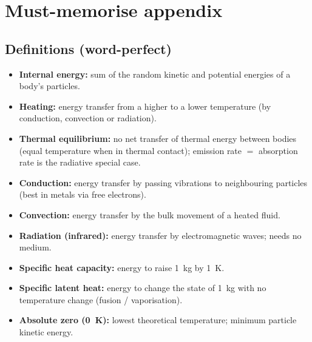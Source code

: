 \documentclass[11pt,a4paper]{article}
\begin{document}
\clearpage
\section{Must-memorise appendix}

\subsection{Definitions (word-perfect)}
\begin{itemize}[leftmargin=1.4em,itemsep=2pt]
  \item \textbf{Internal energy:} sum of the random kinetic and potential energies of a
        body's particles.
  \item \textbf{Heating:} energy transfer from a higher to a lower temperature (by
        conduction, convection or radiation).
  \item \textbf{Thermal equilibrium:} no net transfer of thermal energy between bodies
        (equal temperature when in thermal contact); emission rate $=$ absorption rate is
        the radiative special case.
  \item \textbf{Conduction:} energy transfer by passing vibrations to neighbouring
        particles (best in metals via free electrons).
  \item \textbf{Convection:} energy transfer by the bulk movement of a heated fluid.
  \item \textbf{Radiation (infrared):} energy transfer by electromagnetic waves; needs no
        medium.
  \item \textbf{Specific heat capacity:} energy to raise \SI{1}{\kilogram} by
        \SI{1}{\kelvin}.
  \item \textbf{Specific latent heat:} energy to change the state of \SI{1}{\kilogram} with
        no temperature change (fusion / vaporisation).
  \item \textbf{Absolute zero (\SI{0}{K}):} lowest theoretical temperature; minimum particle
        kinetic energy.
\end{itemize}
\end{document}
